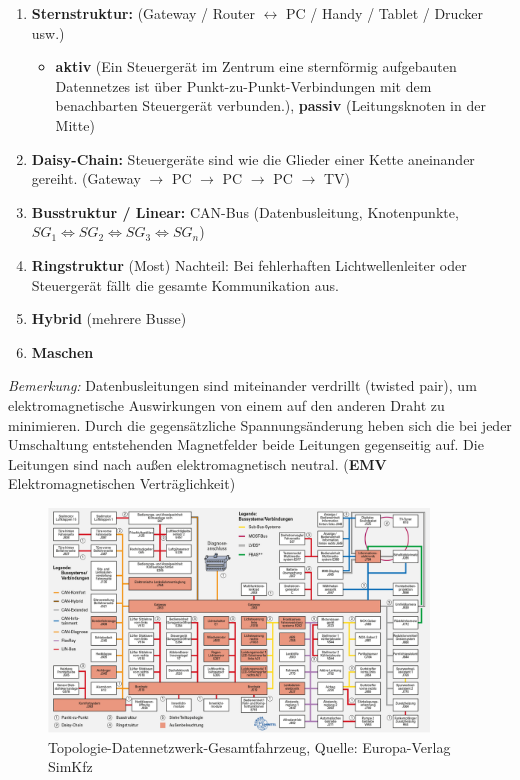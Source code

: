 \begin{enumerate}
\item
  \textbf{Sternstruktur:} (Gateway / Router $\leftrightarrow$ PC /
  Handy / Tablet / Drucker usw.)

  \begin{itemize}
  \item
    \textbf{aktiv} (Ein Steuergerät im Zentrum eine sternförmig
    aufgebauten Datennetzes ist über Punkt-zu-Punkt-Verbindungen mit dem
    benachbarten Steuergerät verbunden.), \textbf{passiv}
    (Leitungsknoten in der Mitte)
  \end{itemize}
\item
  \textbf{Daisy-Chain:} Steuergeräte sind wie die Glieder einer Kette
  aneinander gereiht. (Gateway $\to$ PC $\to$ PC $\to$ PC $\to$
  TV)
\item
  \textbf{Busstruktur / Linear:} CAN-Bus (Datenbusleitung, Knotenpunkte,
  $SG_1 \Longleftrightarrow SG_2 \Longleftrightarrow SG_3 \Longleftrightarrow SG_n$)
\item
  \textbf{Ringstruktur} (Most) Nachteil: Bei fehlerhaften
  Lichtwellenleiter oder Steuergerät fällt die gesamte Kommunikation
  aus.
\item
  \textbf{Hybrid} (mehrere Busse)
\item
  \textbf{Maschen}
\end{enumerate}

\emph{Bemerkung:} Datenbusleitungen sind miteinander verdrillt (twisted
pair), um elektromagnetische Auswirkungen von einem auf den anderen
Draht zu minimieren. Durch die gegensätzliche Spannungsänderung heben
sich die bei jeder Umschaltung entstehenden Magnetfelder beide Leitungen
gegenseitig auf. Die Leitungen sind nach außen elektromagnetisch
neutral. (\textbf{EMV} Elektromagnetischen Verträglichkeit)

\begin{figure}[!ht]%
\centering
\includegraphics[width=0.9\textwidth]{images/CAN/Topologie-Datennetzwerk-Gesamtfahrzeug.png}
\caption{Topologie-Datennetzwerk-Gesamtfahrzeug, Quelle: Europa-Verlag
SimKfz}
\end{figure}

